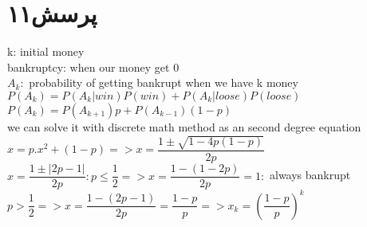 \documentclass[a4paper]{article}
\begin{document}
\pagebreak
\section*{پرسش۱۱}
\begin{latin}
k: initial money\\
bankruptcy: when our money get 0\\
$A_k:$ probability of getting bankrupt when we have k money\\
$ P(A_k) = P(A_k|win)P(win) + P(A_k|loose)P(loose)$\\
$P(A_k) = P(A_{k+1})p + P(A_{k-1})(1-p)$\\
we can solve it with discrete math method as an second degree equation\\
$x = p.x^2 + (1-p) => x = \dfrac{1 \pm \sqrt{1 - 4p(1-p)}}{2p}$\\
$x = \dfrac{1 \pm |2p-1|}{2p}: p \leq \dfrac{1}{2} => x = \dfrac{1 - (1-2p)}{2p} = 1:$ always bankrupt\\
$p > \dfrac{1}{2} => x = \dfrac{1 - (2p-1)}{2p} = \dfrac{1-p}{p} => x_k = (\dfrac{1-p}{p})^k$
\end{latin}

\pagebreak
\end{document}
